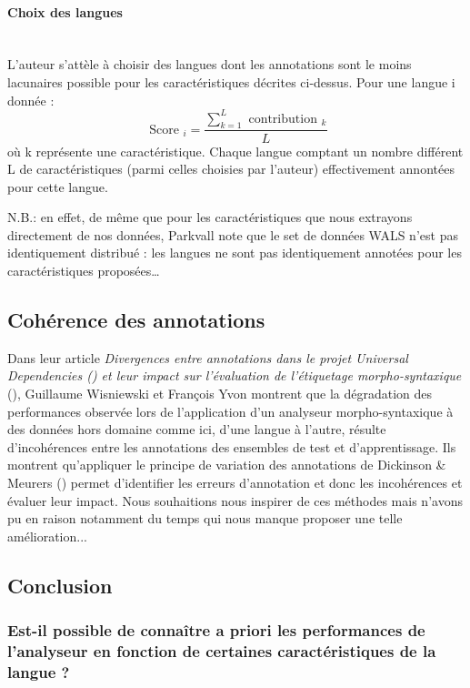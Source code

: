 \documentclass[a4paper, twoside, 12pt]{article}
\newcommand{\myparagraph}[1]{\paragraph{#1}\mbox{}\\}
\begin{document}
    \myparagraph{Choix des langues}

    L’auteur s’attèle à choisir des langues dont les annotations sont le moins lacunaires possible pour les caractéristiques décrites ci-dessus. Pour une langue i donnée :
    \begin{equation}
        \text { Score }_{i}=\frac{\sum_{k=1}^{L} \text { contribution }_{k}}{L}
    \end{equation}
    où k représente une caractéristique. Chaque langue comptant un nombre différent L de caractéristiques (parmi celles choisies par l'auteur) effectivement annontées pour cette langue. \par
    N.B.: en effet, de même que pour les caractéristiques que nous extrayons directement de nos données, Parkvall note que le set de données WALS n’est pas identiquement distribué : les langues ne sont pas identiquement annotées pour les caractéristiques proposées…

    \subsection{Cohérence des annotations}

    Dans leur article \textit{Divergences entre annotations dans le projet Universal Dependencies (\cite{nivre}) et leur impact sur l’évaluation de l’étiquetage morpho-syntaxique} (\cite{wisniewski}), Guillaume Wisniewski et François Yvon montrent que la dégradation des performances observée lors de l’application d’un analyseur morpho-syntaxique à des données hors domaine comme ici, d'une langue à l'autre, résulte d’incohérences entre les annotations des ensembles de test et d’apprentissage. Ils montrent qu'appliquer le principe de variation des annotations de Dickinson \& Meurers (\cite{meueres}) permet d'identifier les erreurs d’annotation et donc les incohérences et évaluer leur impact. Nous souhaitions nous inspirer de ces méthodes mais n'avons pu en raison notamment du temps qui nous manque proposer une telle amélioration...

    \subsection{Conclusion}


    \subsubsection{Est-il possible de connaître a priori les performances de l’analyseur en fonction de certaines caractéristiques de la langue ?}
\end{document}
